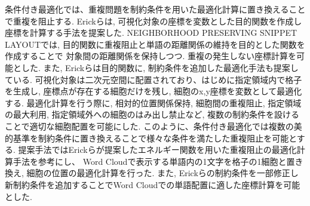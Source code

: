 \documentclass[syuuron]{kuee}
\begin{document}
		条件付き最適化では、重複問題を制約条件を用いた最適化計算に置き換えることで重複を阻止する. 
		Erickらは, 可視化対象の座標を変数とした目的関数を作成し座標を計算する手法を提案した\cite{or1}. 
		NEIGHBORHOOD PRESERVING SNIPPET LAYOUTでは, 目的関数に重複阻止と単語の距離関係の維持を目的とした関数を作成することで
		対象間の距離関係を保持しつつ. 重複の発生しない座標計算を可能とした. 
		また, Erickらは目的関数に, 制約条件を追加した最適化手法も提案している\cite{or2}.  
		可視化対象は二次元空間に配置されており、はじめに指定領域内で格子を生成し, 座標点が存在する細胞だけを残し, 細胞のx,y座標を変数として最適化する. 
		最適化計算を行う際に, 相対的位置関係保持, 細胞間の重複阻止, 指定領域の最大利用, 指定領域外への細胞のはみ出し禁止など, 
		複数の制約条件を設けることで適切な細胞配置を可能にした. 
		このように、条件付き最適化では複数の美的基準を制約条件に置き換えることで様々な条件を満たした重複阻止を可能とする. 
		提案手法ではErickらが提案したエネルギー関数を用いた重複阻止の最適化計算手法を参考にし、
		Word Cloudで表示する単語内の1文字を格子の1細胞と置き換え, 細胞の位置の最適化計算を行った. 
		また, Erickらの制約条件を一部修正し新制約条件を追加することでWord Cloudでの単語配置に適した座標計算を可能とした. 
	
\end{document}
